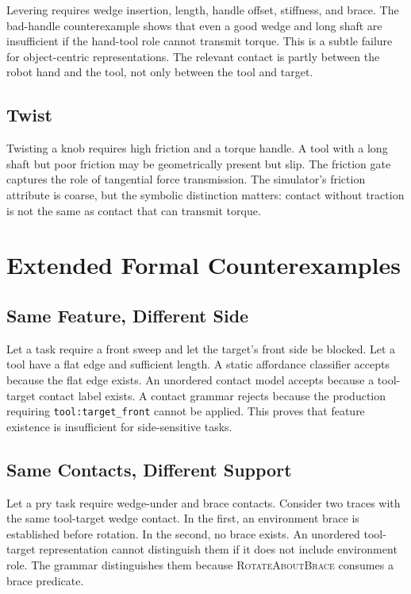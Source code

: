 \documentclass{article}
\begin{document}
Levering requires wedge insertion, length, handle offset, stiffness, and brace. The bad-handle counterexample shows that even a good wedge and long shaft are insufficient if the hand-tool role cannot transmit torque. This is a subtle failure for object-centric representations. The relevant contact is partly between the robot hand and the tool, not only between the tool and target.

\subsection{Twist}

Twisting a knob requires high friction and a torque handle. A tool with a long shaft but poor friction may be geometrically present but slip. The friction gate captures the role of tangential force transmission. The simulator's friction attribute is coarse, but the symbolic distinction matters: contact without traction is not the same as contact that can transmit torque.

\section{Extended Formal Counterexamples}

\subsection{Same Feature, Different Side}

Let a task require a front sweep and let the target's front side be blocked. Let a tool have a flat edge and sufficient length. A static affordance classifier accepts because the flat edge exists. An unordered contact model accepts because a tool-target contact label exists. A contact grammar rejects because the production requiring \texttt{tool:target\_front} cannot be applied. This proves that feature existence is insufficient for side-sensitive tasks.

\subsection{Same Contacts, Different Support}

Let a pry task require wedge-under and brace contacts. Consider two traces with the same tool-target wedge contact. In the first, an environment brace is established before rotation. In the second, no brace exists. An unordered tool-target representation cannot distinguish them if it does not include environment role. The grammar distinguishes them because \textsc{RotateAboutBrace} consumes a brace predicate.
\end{document}

